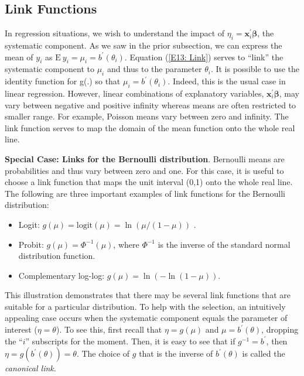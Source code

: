 \subsection{Link Functions}\label{S13:LinkFunction}

In regression situations, we wish to understand the impact of
$\eta_i = \mathbf{x}_i^{\mathbf{\prime}} \boldsymbol \beta$, the
systematic component. As we saw in the prior subsection, we can
express the mean of $y_i$ as $\mathrm{E~}y_i=\mu _i=b^{\prime
}(\theta_i)$. Equation (\ref{E13: Link}) serves to ``link'' the
systematic component to $\mu_i$ and thus to the parameter
$\theta_i$. It is possible to use the identity function for g(.) so
that $\mu _i=b^{\prime }(\theta_i)$. Indeed, this is the usual case
in linear regression. However, linear combinations of explanatory
variables, $\mathbf{x}_i^{\mathbf{\prime }}\boldsymbol \beta$, may
vary between negative and positive infinity whereas means are often
restricted to smaller range. For example, Poisson means vary between
zero and infinity. The link function serves to map the domain of the
mean function onto the whole real line.

\linejed

\textbf{Special Case: Links for the Bernoulli distribution}.
Bernoulli means are probabilities and thus vary between zero and
one. For this case, it is useful to choose a link function that maps
the unit interval (0,1) onto the whole real line. The following are
three important examples of link functions for the Bernoulli
distribution:

\begin{itemize}
\item Logit: $g(\mu )=\mathrm{logit}(\mu )=\ln (\mu /(1-\mu ))$ .

\item Probit: $g(\mu )=\Phi ^{-1}(\mu )$, where $\Phi ^{-1}$ is the inverse
of the standard normal distribution function.

\item Complementary log-log: $g(\mu )=\ln \left( -\ln (1-\mu )\right) $.
\end{itemize}

\linejed

This illustration demonstrates that there may be several link
functions that are suitable for a particular distribution. To help
with the selection, an intuitively appealing case occurs when the
systematic component equals the
parameter of interest ($\eta =\theta $). To see this, first recall that $%
\eta =g(\mu )$ and $\mu =b^{\prime }(\theta )$, dropping the ``$i$''
subscripts for the moment. Then, it is easy to see that if
$g^{-1}=b^{\prime }$, then $\eta =g(b^{\prime }(\theta ))=\theta $.
The choice of $g$ that is the inverse of $b^{\prime }(\theta )$ is
called the \emph{canonical link}.

